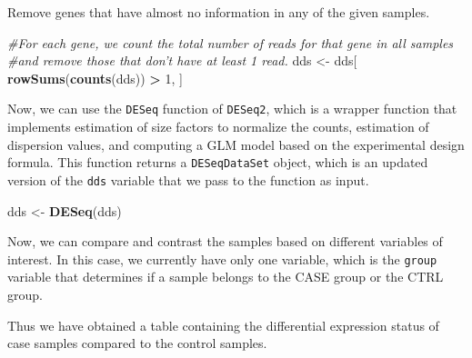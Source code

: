 \documentclass[12pt,]{krantz}
\newenvironment{Shaded}{\begin{snugshade}}{\end{snugshade}}
\newcommand{\CommentTok}[1]{\textcolor[rgb]{0.56,0.35,0.01}{\textit{#1}}}
\newcommand{\DataTypeTok}[1]{\textcolor[rgb]{0.13,0.29,0.53}{#1}}
\newcommand{\DecValTok}[1]{\textcolor[rgb]{0.00,0.00,0.81}{#1}}
\newcommand{\KeywordTok}[1]{\textcolor[rgb]{0.13,0.29,0.53}{\textbf{#1}}}
\newcommand{\NormalTok}[1]{#1}
\newcommand{\OperatorTok}[1]{\textcolor[rgb]{0.81,0.36,0.00}{\textbf{#1}}}
\newcommand{\StringTok}[1]{\textcolor[rgb]{0.31,0.60,0.02}{#1}}
\begin{document}
Remove genes that have almost no information in any of the given samples.

\begin{Shaded}
\begin{Highlighting}[]
\CommentTok{#For each gene, we count the total number of reads for that gene in all samples }
\CommentTok{#and remove those that don't have at least 1 read. }
\NormalTok{dds <-}\StringTok{ }\NormalTok{dds[ }\KeywordTok{rowSums}\NormalTok{(}\KeywordTok{counts}\NormalTok{(dds)) }\OperatorTok{>}\StringTok{ }\DecValTok{1}\NormalTok{, ]}
\end{Highlighting}
\end{Shaded}

Now, we can use the \texttt{DESeq} function of \texttt{DESeq2}, which is a wrapper function that implements estimation of size factors to normalize the counts, estimation of dispersion values, and computing a GLM model based on the experimental design formula. This function returns a \texttt{DESeqDataSet} object, which is an updated version of the \texttt{dds} variable that we pass to the function as input.

\begin{Shaded}
\begin{Highlighting}[]
\NormalTok{dds <-}\StringTok{ }\KeywordTok{DESeq}\NormalTok{(dds)}
\end{Highlighting}
\end{Shaded}

Now, we can compare and contrast the samples based on different variables of interest. In this case, we currently have only one variable, which is the \texttt{group} variable that determines if a sample belongs to the CASE group or the CTRL group.

\begin{Shaded}
\end{Shaded}

Thus we have obtained a table containing the differential expression status of case samples compared to the control samples.
\end{document}
